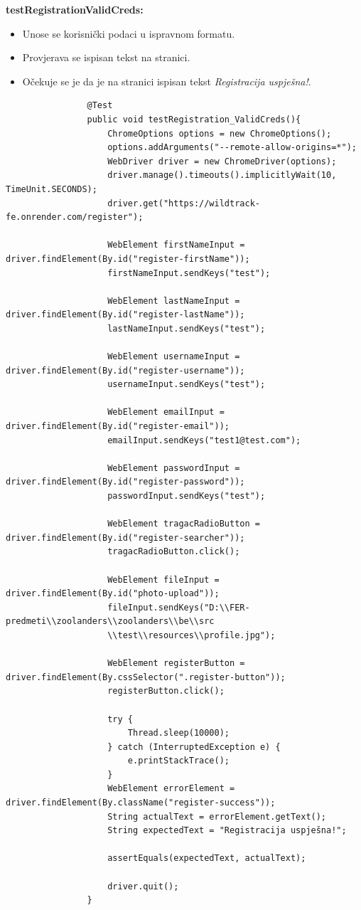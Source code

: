 			\textbf{testRegistrationValidCreds:}
			\begin{itemize}
				\item Unose se korisnički podaci u ispravnom formatu.
				\item Provjerava se ispisan tekst na stranici.
				\item Očekuje se je da je na stranici ispisan tekst \textit{Registracija uspješna!}.
			\end{itemize}
			\begin{lstlisting}
				@Test
				public void testRegistration_ValidCreds(){
					ChromeOptions options = new ChromeOptions();
					options.addArguments("--remote-allow-origins=*");
					WebDriver driver = new ChromeDriver(options);
					driver.manage().timeouts().implicitlyWait(10, TimeUnit.SECONDS);
					driver.get("https://wildtrack-fe.onrender.com/register");
					
					WebElement firstNameInput = driver.findElement(By.id("register-firstName"));
					firstNameInput.sendKeys("test");
					
					WebElement lastNameInput = driver.findElement(By.id("register-lastName"));
					lastNameInput.sendKeys("test");
					
					WebElement usernameInput = driver.findElement(By.id("register-username"));
					usernameInput.sendKeys("test");
					
					WebElement emailInput = driver.findElement(By.id("register-email"));
					emailInput.sendKeys("test1@test.com");
					
					WebElement passwordInput = driver.findElement(By.id("register-password"));
					passwordInput.sendKeys("test");
					
					WebElement tragacRadioButton = driver.findElement(By.id("register-searcher"));
					tragacRadioButton.click();
					
					WebElement fileInput = driver.findElement(By.id("photo-upload"));
					fileInput.sendKeys("D:\\FER-predmeti\\zoolanders\\zoolanders\\be\\src
					\\test\\resources\\profile.jpg");
					
					WebElement registerButton = driver.findElement(By.cssSelector(".register-button"));
					registerButton.click();
					
					try {
						Thread.sleep(10000);
					} catch (InterruptedException e) {
						e.printStackTrace();
					}
					WebElement errorElement = driver.findElement(By.className("register-success"));
					String actualText = errorElement.getText();
					String expectedText = "Registracija uspješna!";
					
					assertEquals(expectedText, actualText);
					
					driver.quit();
				}
			\end{lstlisting}
			
